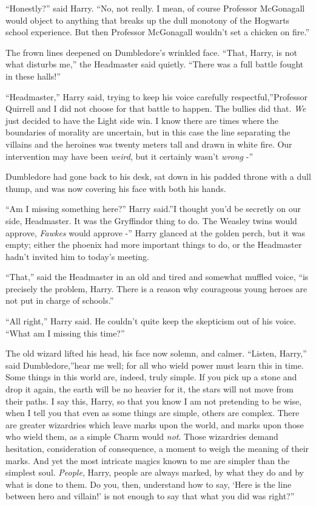 ``Honestly?'' said Harry. ``No, not really. I mean, of course Professor
McGonagall would object to anything that breaks up the dull monotony of
the Hogwarts school experience. But then Professor McGonagall wouldn't
set a chicken on fire.''

The frown lines deepened on Dumbledore's wrinkled face. ``That, Harry,
is not what disturbs me,'' the Headmaster said quietly. ``There was a
full battle fought in these halls!''

``Headmaster,'' Harry said, trying to keep his voice carefully
respectful,''Professor Quirrell and I did not choose for that battle to
happen. The bullies did that. \emph{We} just decided to have the Light
side win. I know there are times where the boundaries of morality are
uncertain, but in this case the line separating the villains and the
heroines was twenty meters tall and drawn in white fire. Our
intervention may have been \emph{weird}, but it certainly wasn't
\emph{wrong} -''

Dumbledore had gone back to his desk, sat down in his padded throne with
a dull thump, and was now covering his face with both his hands.

``Am I missing something here?'' Harry said.''I thought you'd be
secretly on our side, Headmaster. It was the Gryffindor thing to do. The
Weasley twins would approve, \emph{Fawkes} would approve -'' Harry
glanced at the golden perch, but it was empty; either the phoenix had
more important things to do, or the Headmaster hadn't invited him to
today's meeting.

``That,'' said the Headmaster in an old and tired and somewhat muffled
voice, ``is precisely the problem, Harry. There is a reason why
courageous young heroes are not put in charge of schools.''

``All right,'' Harry said. He couldn't quite keep the skepticism out of
his voice. ``What am I missing this time?''

The old wizard lifted his head, his face now solemn, and calmer.
``Listen, Harry,'' said Dumbledore,''hear me well; for all who wield
power must learn this in time. Some things in this world are, indeed,
truly simple. If you pick up a stone and drop it again, the earth will
be no heavier for it, the stars will not move from their paths. I say
this, Harry, so that you know I am not pretending to be wise, when I
tell you that even as some things are simple, others are complex. There
are greater wizardries which leave marks upon the world, and marks upon
those who wield them, as a simple Charm would \emph{not}. Those
wizardries demand hesitation, consideration of consequence, a moment to
weigh the meaning of their marks. And yet the most intricate magics
known to me are simpler than the simplest soul. \emph{People}, Harry,
people are always marked, by what they do and by what is done to them.
Do you, then, understand how to say, `Here is the line between hero and
villain!' is not enough to say that what you did was right?''

